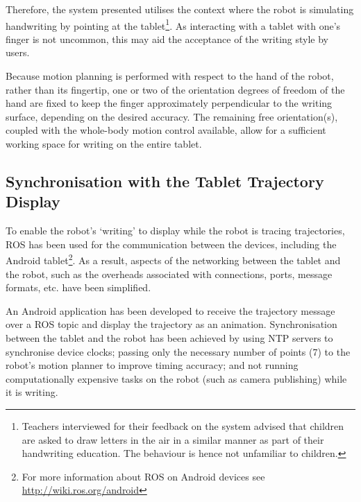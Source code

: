 \documentclass{sig-alternate}
\begin{document}
Therefore, the system presented utilises the context where the robot is
simulating handwriting by pointing at the tablet\footnote{Teachers interviewed
for their feedback on the system advised that children are asked to draw letters
in the air in a similar manner as part of their handwriting education. The behaviour 
is hence not unfamiliar to children.}. As
interacting with a tablet with one's finger is not uncommon, this may aid the
acceptance of the writing style by users. 

Because
motion planning is performed with respect to the hand of the robot, rather than
its fingertip, one or two of the orientation degrees of freedom of the hand
are fixed to keep the finger approximately perpendicular to the writing surface,
depending on the desired accuracy. The remaining free orientation(s), coupled
with the whole-body motion control available, allow for a sufficient working
space for writing on the entire tablet.

\subsection{Synchronisation with the Tablet Trajectory Display}\label{sec:tabletSynch}


To enable the robot's `writing' to display while the robot is tracing
trajectories, ROS has been used for the communication between the devices,
including the Android tablet\footnote{For more information about ROS on Android
devices see \url{http://wiki.ros.org/android}}. As a result, aspects of the
networking between the tablet and the robot, such as the overheads associated
with connections, ports, message formats, etc. have been simplified. 

An Android application has been developed to receive the trajectory message over
a ROS topic and display the trajectory as an
animation. Synchronisation between the tablet and the robot has been achieved by
using NTP servers to synchronise device clocks; passing only the necessary number of points (7)
to the robot's motion planner to improve timing accuracy; and not running 
computationally expensive tasks on the robot (such as camera publishing) while it 
is writing.

\end{document}

